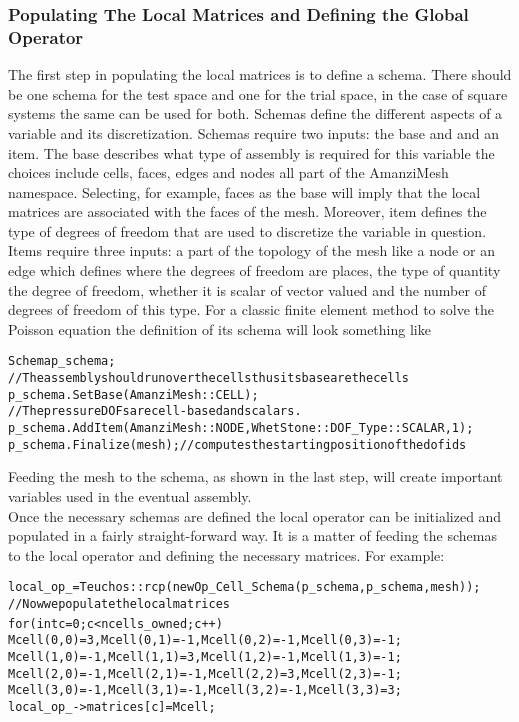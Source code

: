 \subsubsection{Populating The Local Matrices and Defining the Global Operator}\label{Sec:LocalMatAndGlobalOp}
%
The first step in populating the local matrices is to define a schema. There should be one schema for the test space and one for the trial space, in the case of square systems the same can be used for both. Schemas define the different aspects of a variable and its discretization. Schemas require two inputs: the base and and an item. The base describes what type of assembly is required for this variable the choices include cells, faces, edges and nodes all part of the AmanziMesh namespace. Selecting, for example, faces as the base will imply that the local matrices are associated with the faces of the mesh. Moreover, item defines the type of degrees of freedom that are used to discretize the variable in question. Items require three inputs: a part of the topology of the mesh like a node or an edge which defines where the degrees of freedom are places, the type of quantity the degree of freedom, whether it is scalar of vector valued and the number of degrees of freedom of this type. For a classic finite element method to solve the Poisson equation the definition of its schema will look something like
%
\begin{alltt}
	Schema p_schema;
	//The assembly should run over the cells thus its base are the cells
	p_schema.SetBase(AmanziMesh::CELL);
	//The pressure DOFs are cell-based and scalars.
	p_schema.AddItem(AmanziMesh::NODE,WhetStone::DOF_Type::SCALAR,1);
	p_schema.Finalize(mesh); // computes the starting position of the dof ids
\end{alltt}
%
Feeding the mesh to the schema, as shown in the last step, will create important variables used in the eventual assembly.\\
%
Once the necessary schemas are defined the local operator can be initialized and populated in a fairly straight-forward way. It is a matter of feeding the schemas to the local operator and defining the necessary matrices. For example:
%
\begin{alltt}
	local_op_ = Teuchos::rcp(new Op_Cell_Schema(p_schema,p_schema,mesh));
	//Now we populate the local matrices
	for (int c = 0; c < ncells_owned ; c++) {
		Mcell(0,0) = 3, Mcell(0,1) = -1, Mcell(0,2) = -1, Mcell(0,3) = -1;
		Mcell(1,0) = -1, Mcell(1,1) = 3, Mcell(1,2) = -1, Mcell(1,3) = -1;
		Mcell(2,0) = -1, Mcell(2,1) = -1, Mcell(2,2) = 3, Mcell(2,3) = -1;
		Mcell(3,0) = -1, Mcell(3,1) = -1, Mcell(3,2) = -1, Mcell(3,3) = 3;
		local_op_->matrices[c] = Mcell;
	}
\end{alltt}
